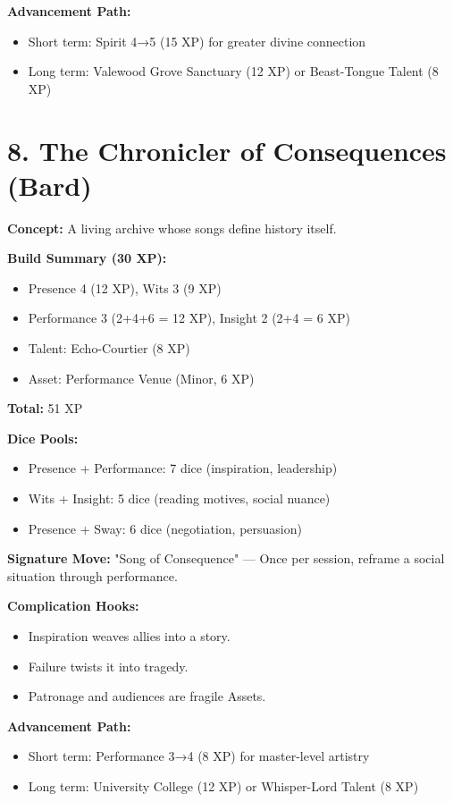 \begin{itemize}
\textbf{Advancement Path:}
\begin{itemize}
  \item Short term: Spirit 4→5 (15 XP) for greater divine connection
  \item Long term: Valewood Grove Sanctuary (12 XP) or Beast-Tongue Talent (8 XP)
\end{itemize}

\section{8. The Chronicler of Consequences (Bard)}

\textbf{Concept:} A living archive whose songs define history itself.

\textbf{Build Summary (30 XP):}
\begin{itemize}
  \item Presence 4 (12 XP), Wits 3 (9 XP)
  \item Performance 3 (2+4+6 = 12 XP), Insight 2 (2+4 = 6 XP)
  \item Talent: Echo-Courtier (8 XP)
  \item Asset: Performance Venue (Minor, 6 XP)
\end{itemize}
\textbf{Total:} 51 XP

\textbf{Dice Pools:}
\begin{itemize}
  \item Presence + Performance: 7 dice (inspiration, leadership)
  \item Wits + Insight: 5 dice (reading motives, social nuance)
  \item Presence + Sway: 6 dice (negotiation, persuasion)
\end{itemize}

\textbf{Signature Move:} "Song of Consequence" — Once per session, reframe a social situation through performance.

\textbf{Complication Hooks:}
\begin{itemize}
  \item Inspiration weaves allies into a story.
  \item Failure twists it into tragedy.
  \item Patronage and audiences are fragile Assets.
\end{itemize}

\textbf{Advancement Path:}
\begin{itemize}
  \item Short term: Performance 3→4 (8 XP) for master-level artistry
  \item Long term: University College (12 XP) or Whisper-Lord Talent (8 XP)
\end{itemize}


\end{itemize}
